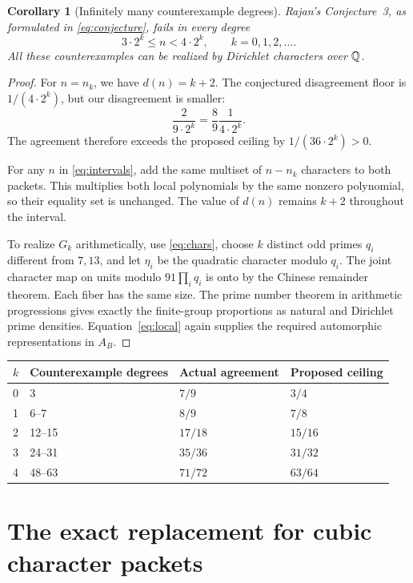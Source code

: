 \documentclass[11pt]{article}
\newtheorem{corollary}[theorem]{Corollary}
\theoremstyle{remark}\newtheorem{remark}[theorem]{Remark}
\begin{document}
\begin{corollary}[Infinitely many counterexample degrees]\label{cor:intervals}
Rajan's Conjecture~3, as formulated in \eqref{eq:conjecture}, fails in every degree
\begin{equation}\label{eq:intervals}
 3\cdot2^k\le n<4\cdot2^k,\qquad k=0,1,2,\ldots.
\end{equation}
All these counterexamples can be realized by Dirichlet characters over $\mathbb Q$.
\end{corollary}

\begin{proof}
For $n=n_k$, we have $d(n)=k+2$. The conjectured disagreement floor is $1/(4\cdot2^k)$, but our disagreement is smaller:
\[
 \frac{2}{9\cdot2^k}=\frac89\frac1{4\cdot2^k}.
\]
The agreement therefore exceeds the proposed ceiling by $1/(36\cdot2^k)>0$.

For any $n$ in \eqref{eq:intervals}, add the same multiset of $n-n_k$ characters to both packets. This multiplies both local polynomials by the same nonzero polynomial, so their equality set is unchanged. The value of $d(n)$ remains $k+2$ throughout the interval.

To realize $G_k$ arithmetically, use \eqref{eq:chars}, choose $k$ distinct odd primes $q_i$ different from $7,13$, and let $\eta_i$ be the quadratic character modulo $q_i$. The joint character map on units modulo $91\prod_iq_i$ is onto by the Chinese remainder theorem. Each fiber has the same size. The prime number theorem in arithmetic progressions gives exactly the finite-group proportions as natural and Dirichlet prime densities. Equation~\eqref{eq:local} again supplies the required automorphic representations in $A_B$.
\end{proof}

\begin{center}
\begin{tabular}{@{}llll@{}}\toprule
$k$ & Counterexample degrees & Actual agreement & Proposed ceiling\\\midrule
0 & 3 & $7/9$ & $3/4$\\
1 & 6--7 & $8/9$ & $7/8$\\
2 & 12--15 & $17/18$ & $15/16$\\
3 & 24--31 & $35/36$ & $31/32$\\
4 & 48--63 & $71/72$ & $63/64$\\\bottomrule
\end{tabular}
\end{center}

\section{The exact replacement for cubic character packets}
\end{document}
